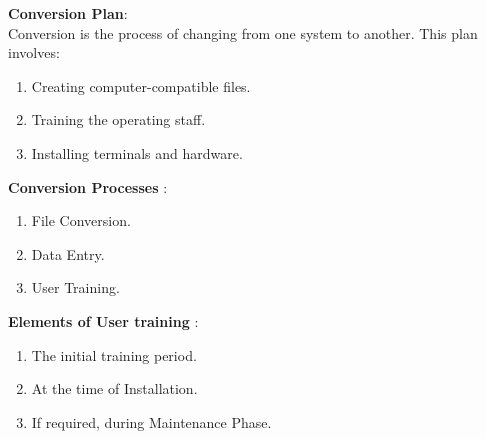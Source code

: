 {\bf Conversion Plan}:\\
Conversion is the process of changing from one system to another. This plan involves:
\begin{enumerate}
\item Creating computer-compatible files.
\item Training the operating staff.
\item Installing terminals and hardware.
\end{enumerate}
\newpage
{\bf Conversion Processes} :
\begin{enumerate}
\item File Conversion.
\item  Data Entry.
\item User Training.
\end{enumerate}
\vskip 0.5cm
{\bf Elements of User training} :
\begin{enumerate}
\item The initial training period.
\item At the time of Installation.
\item If required, during Maintenance Phase.
\end{enumerate}

\newpage
